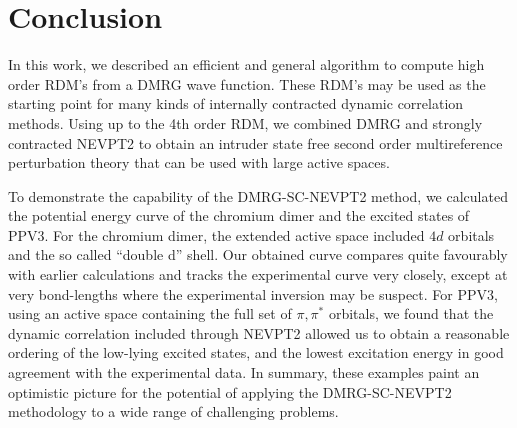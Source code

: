 
\section{Conclusion}

In this work, we described an efficient and general algorithm to compute high order RDM's from a DMRG wave function.
These RDM's may be used as the starting point for many kinds of internally contracted dynamic correlation methods.
Using up to the 4th order RDM, we combined DMRG and strongly contracted NEVPT2 to obtain
an intruder state free second order multireference perturbation theory that can be used with large active spaces.

To demonstrate the capability of the DMRG-SC-NEVPT2 method, we calculated the potential energy curve of the chromium dimer and the excited 
states of PPV3. For the chromium dimer, the extended active space included $4d$ orbitals and the so called ``double d'' shell.
Our obtained curve compares quite favourably with earlier calculations and tracks the experimental curve very closely, except
at very bond-lengths where the experimental inversion may be suspect.
For PPV3, using an active space containing the full set of $\pi, \pi^*$ orbitals, we found that the dynamic correlation included through NEVPT2 allowed us to obtain
a reasonable ordering of the low-lying excited states, and the lowest excitation energy in good agreement with
the experimental data. In summary, these examples paint an optimistic picture for the potential of applying the
DMRG-SC-NEVPT2 methodology to a wide range of challenging problems.
